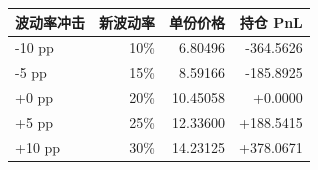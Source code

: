 \begin{tabular}{lrrr}
\toprule
波动率冲击 & 新波动率 & 单份价格 & 持仓 PnL \\
\midrule
-10 pp & 10\% & 6.80496 & -364.5626 \\
-5 pp & 15\% & 8.59166 & -185.8925 \\
+0 pp & 20\% & 10.45058 & +0.0000 \\
+5 pp & 25\% & 12.33600 & +188.5415 \\
+10 pp & 30\% & 14.23125 & +378.0671 \\
\bottomrule
\end{tabular}
